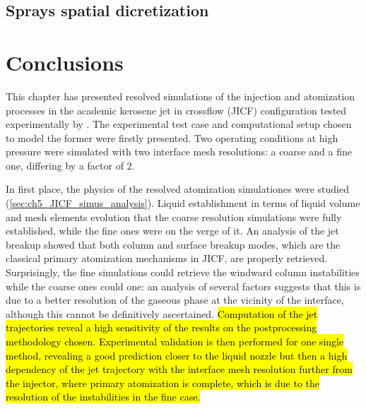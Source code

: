 \subsection{Sprays spatial dicretization}
\label{subsec:ch5_learning_SLI}




\clearpage


\section{Conclusions}

This chapter has presented resolved simulations of the injection and atomization processes in the academic kerosene jet in crossflow (JICF) configuration tested experimentally by . The experimental test case and computational setup chosen to model the former were firstly presented. Two operating conditions at high pressure were simulated with two interface mesh resolutions: a coarse and a fine one, differing by a factor of 2. 

In first place, the physics of the resolved atomization simulationes were studied (\ref{sec:ch5_JICF_simus_analysis}). Liquid establishment in terms of liquid volume and mesh elements evolution that the coarse resolution simulations were fully established, while the fine ones were on the verge of it. An analysis of the jet breakup showed that both column and surface breakup modes, which are the classical primary atomization mechanisms in JICF, are properly retrieved. Surprisingly, the fine simulations could retrieve the windward column instabilities while the coarse ones could one: an analysis of several factors suggests that this is due to a better resolution of the gaseous phase at the vicinity of the interface, although this cannot be definitively ascertained. \hl{Computation of the jet trajectories reveal a high sensitivity of the results on the postprocessing methodology chosen. Experimental validation is then performed for one single method, revealing a good prediction closer to the liquid nozzle but then a high dependency of the jet trajectory with the interface mesh resolution further from the injector, where primary atomization is complete, which is due to the resolution of the instabilities in the fine case.}



